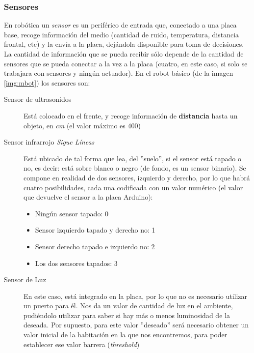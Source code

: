 \subsubsection{Sensores}\label{ssubsec:sensores}
En robótica un \textit{sensor} es un periférico de entrada que, conectado a una placa base, recoge información del medio (cantidad de ruido, temperatura, distancia frontal, etc) y la envía a la placa, dejándola disponible para toma de decisiones. La cantidad de información que se pueda recibir sólo depende de la cantidad de sensores que se pueda conectar a la vez a la placa (cuatro, en este caso, si solo se trabajara con sensores y ningún actuador). En el robot básico (de la imagen \ref{img:mbot}) los sensores son:
\begin{description}
	\item [Sensor de ultrasonidos] Está colocado en el frente, y recoge información de \textbf{distancia} hasta un objeto, en \textit{cm} (el valor máximo es 400)
	
	\item [Sensor infrarrojo \textit{Sigue Líneas}] Está ubicado de tal forma que lea, del ''suelo'', si el sensor está tapado o no, es decir: está sobre blanco o negro (de fondo, es un sensor binario). Se compone en realidad de dos sensores, izquierdo y derecho, por lo que habrá cuatro posibilidades, cada una codificada con un valor numérico (el valor que devuelve el sensor a la placa Arduino):
	\begin{itemize}
		\item Ningún sensor tapado: 0
		\item Sensor izquierdo tapado y derecho no: 1
		\item Sensor derecho tapado e izquierdo no: 2
		\item Los dos sensores tapados: 3
	\end{itemize}
	 \item [Sensor de Luz] En este caso, está integrado en la placa, por lo que no es necesario utilizar un puerto para él. Nos da un valor de cantidad de luz en el ambiente, pudiéndolo utilizar para saber si hay más o menos luminosidad de la deseada. Por supuesto, para este valor ''deseado'' será necesario obtener un valor inicial de la habitación en la que nos encontremos, para poder establecer ese valor barrera (\textit{threshold})
\end{description}
